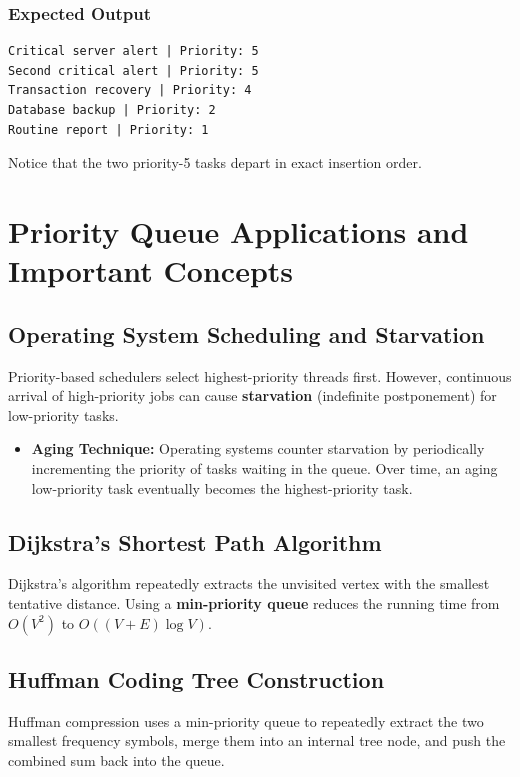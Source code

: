 \subsubsection{Expected Output}
\begin{lstlisting}[style=pseudocode]
Critical server alert | Priority: 5
Second critical alert | Priority: 5
Transaction recovery | Priority: 4
Database backup | Priority: 2
Routine report | Priority: 1
\end{lstlisting}
Notice that the two priority-5 tasks depart in exact insertion order.

\section{Priority Queue Applications and Important Concepts}

\subsection{Operating System Scheduling and Starvation}
Priority-based schedulers select highest-priority threads first. However, continuous arrival of high-priority jobs can cause \textbf{starvation} (indefinite postponement) for low-priority tasks.
\begin{itemize}
    \item \textbf{Aging Technique:} Operating systems counter starvation by periodically incrementing the priority of tasks waiting in the queue. Over time, an aging low-priority task eventually becomes the highest-priority task.
\end{itemize}

\subsection{Dijkstra's Shortest Path Algorithm}
Dijkstra's algorithm repeatedly extracts the unvisited vertex with the smallest tentative distance. Using a \textbf{min-priority queue} reduces the running time from $O(V^2)$ to $O((V + E) \log V)$.

\subsection{Huffman Coding Tree Construction}
Huffman compression uses a min-priority queue to repeatedly extract the two smallest frequency symbols, merge them into an internal tree node, and push the combined sum back into the queue.

